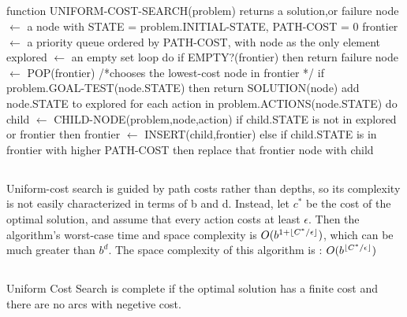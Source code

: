 \documentclass[
10pt, %
a4paper, %
oneside, %
headinclude,footinclude, %
BCOR5mm, %
]{scrartcl}
\DeclarePairedDelimiter\floor{\lfloor}{\rfloor}
\newcommand\tab[1][1cm]{\hspace*{#1}}
\begin{document}
\subsection*{}
function UNIFORM-COST-SEARCH(problem) returns a solution,or failure\newline
\tab node $\leftarrow$ a node with STATE = problem.INITIAL-STATE, PATH-COST = 0\newline
\tab frontier $\leftarrow$ a priority queue ordered by PATH-COST, with node as the only element\newline
\tab explored $\leftarrow$ an empty set\newline
\tab loop do\newline
\tab\tab if EMPTY?(frontier) then return failure\newline
\tab\tab node $\leftarrow$ POP(frontier) /*chooses the lowest-cost node in frontier */\newline
\tab\tab if problem.GOAL-TEST(node.STATE) then return SOLUTION(node)\newline
\tab\tab add node.STATE to explored\newline
\tab\tab for each action in problem.ACTIONS(node.STATE) do\newline
\tab\tab\tab child $\leftarrow$ CHILD-NODE(problem,node,action)\newline
\tab\tab\tab if child.STATE is not in explored or frontier then\newline
\tab\tab\tab\tab frontier $\leftarrow$ INSERT(child,frontier)\newline
\tab\tab\tab else if child.STATE is in frontier with higher PATH-COST then\newline
\tab\tab\tab\tab replace that frontier node with child\newline

\subsection*{}
Uniform-cost search is guided by path costs rather than depths, so its complexity is not
easily characterized in terms of b and d. Instead, let $c^*$
be the cost of the optimal solution, and assume that every action costs at least
$\epsilon$. Then the algorithm’s worst-case time and space
complexity is $O(b^{1+\floor{C^*/\epsilon}})$, which can be much greater than $b^d$.\newline
The space complexity of this algorithm is :  $O(b^{\floor{C^*/\epsilon}})$
\subsection*{}
Uniform Cost Search is complete if the optimal solution has a finite cost and there are no arcs with negetive cost.
\end{document}

